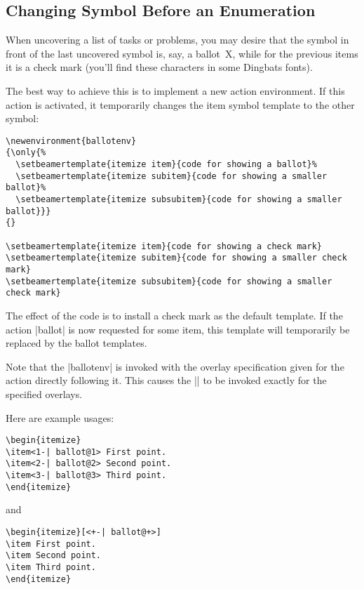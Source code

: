 \subsection{Changing Symbol Before an Enumeration}

When uncovering a list of tasks or problems, you may desire that the
symbol in front of the last uncovered symbol is, say, a ballot~X,
while for the previous items it is a check mark (you'll find these
characters in some Dingbats fonts).

The best way to achieve this is to implement a new action
environment. If this action is activated, it temporarily changes the
item symbol template to the other symbol:

\begin{verbatim}
\newenvironment{ballotenv}
{\only{%
  \setbeamertemplate{itemize item}{code for showing a ballot}%
  \setbeamertemplate{itemize subitem}{code for showing a smaller ballot}%
  \setbeamertemplate{itemize subsubitem}{code for showing a smaller ballot}}}
{}

\setbeamertemplate{itemize item}{code for showing a check mark}
\setbeamertemplate{itemize subitem}{code for showing a smaller check mark}
\setbeamertemplate{itemize subsubitem}{code for showing a smaller check mark}
\end{verbatim}

The effect of the code is to install a check mark as the default
template. If the action |ballot| is now requested for some item, this
template will temporarily be replaced by the ballot templates.

Note that the |ballotenv| is invoked with the overlay specification
given for the action directly following it. This causes the |\only| to
be invoked exactly for the specified overlays.

Here are example usages:

\begin{verbatim}
\begin{itemize}
\item<1-| ballot@1> First point.
\item<2-| ballot@2> Second point.
\item<3-| ballot@3> Third point.
\end{itemize}
\end{verbatim}

and

\begin{verbatim}
\begin{itemize}[<+-| ballot@+>]
\item First point.
\item Second point.
\item Third point.
\end{itemize}
\end{verbatim}

